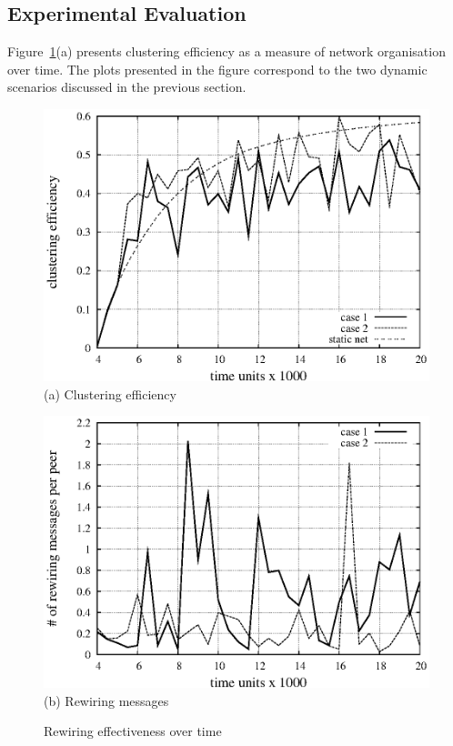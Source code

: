 \documentclass{llncs}
\begin{document}
\subsection{Experimental Evaluation}
Figure~\ref{fig:rewiring}(a) presents clustering efficiency as a measure of  network organisation over time. The plots presented in the figure correspond to the two dynamic scenarios discussed in the previous section.

\begin{figure}[t]
\begin{minipage}[t]{0.5\linewidth}
    \includegraphics[width=0.99\columnwidth]{cE.eps}\\
    \centering \small{(a) Clustering efficiency}
\end{minipage}
\begin{minipage}[t]{0.5\linewidth}
    \includegraphics[width=0.99\columnwidth]{rew.eps}\\
     \centering \small{(b) Rewiring messages}
\end{minipage}
\caption{Rewiring effectiveness over time} \label{fig:rewiring}
\end{figure}
\end{document}
